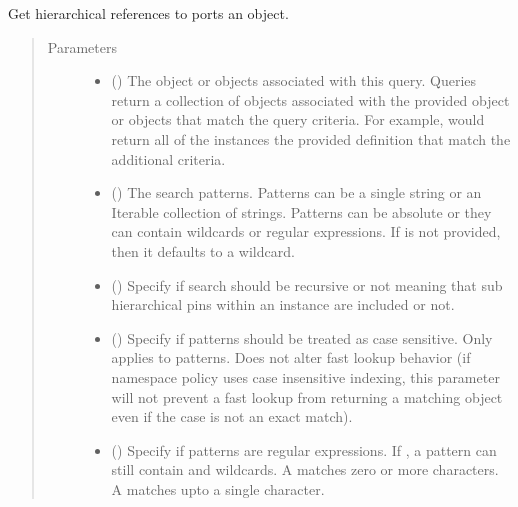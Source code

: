 \documentclass[letterpaper,10pt,english,openany,oneside]{sphinxmanual}
\begin{document}
\begin{fulllineitems}
\label{\detokenize{reference/classes/generated/spydrnet.get_hports:spydrnet.get_hports}}
Get hierarchical references to ports  an object.
\begin{quote}\begin{description}
\item[{Parameters}] \leavevmode\begin{itemize}
\item {} 
 () \textendash{} The object or objects associated with this query. Queries return a collection of objects associated with the
provided object or objects that match the query criteria. For example,  would
return all of the instances  the provided definition that match the additional criteria.

\item {} 
 () \textendash{} The search patterns. Patterns can be a single string or an Iterable collection of strings. Patterns can be
absolute or they can contain wildcards or regular expressions. If  is not provided, then it defaults
to a wildcard.

\item {} 
 () \textendash{} Specify if search should be recursive or not meaning that sub hierarchical pins within an instance are
included or not.

\item {} 
 () \textendash{} Specify if patterns should be treated as case sensitive. Only applies to patterns. Does not alter fast lookup
behavior (if namespace policy uses case insensitive indexing, this parameter will not prevent a fast lookup
from returning a matching object even if the case is not an exact match).

\item {} 
 () \textendash{} Specify if patterns are regular expressions. If , a pattern can still contain \sphinxtitleref{*} and  wildcards. A
\sphinxtitleref{*} matches zero or more characters. A  matches upto a single character.


\end{itemize}
\end{description}
\end{quote}
\end{fulllineitems}
\end{document}
